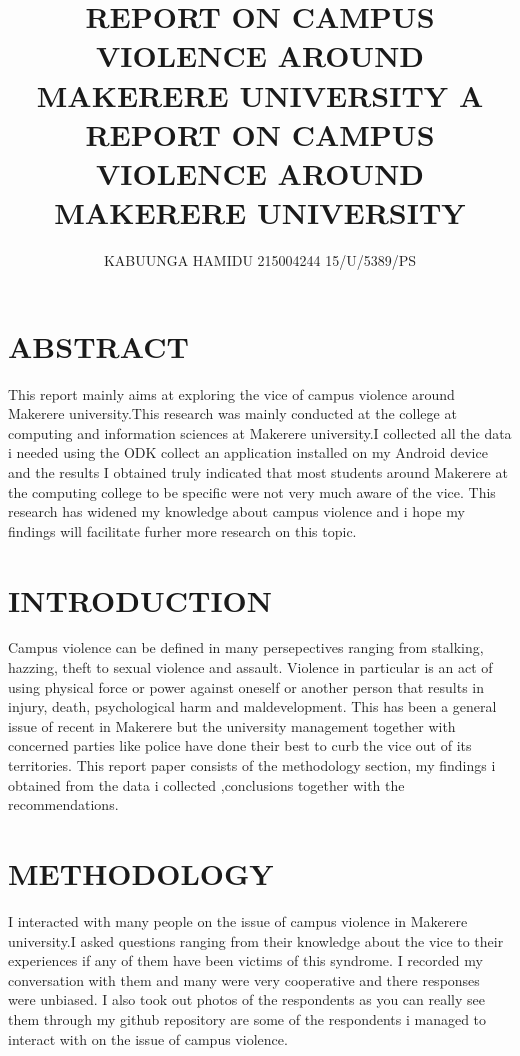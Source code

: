 \documentclass[10pt]{report}
\title{
{REPORT ON CAMPUS VIOLENCE AROUND MAKERERE UNIVERSITY}}
\author{
{KABUUNGA HAMIDU 215004244  15/U/5389/PS}}
\begin{document}
	\title{	{A REPORT ON  CAMPUS VIOLENCE AROUND MAKERERE UNIVERSITY}\\}
\maketitle
\section{ABSTRACT}
{This report mainly aims at exploring the vice of campus violence around Makerere university.This research was mainly conducted at the college at computing and information sciences at Makerere university.I collected all the data i needed using the ODK collect an application installed on my Android device and the results I obtained truly indicated that most students around Makerere at the computing college to be specific were not very much aware of the vice. This research has widened my knowledge about campus violence and i hope my findings will facilitate furher more research on this topic.}
\section{INTRODUCTION}
{Campus violence can be defined in many persepectives ranging from stalking, hazzing, theft to sexual violence and assault. Violence in particular is an act of using physical force or power against oneself or another person that results in injury, death, psychological harm and maldevelopment. This has been a general issue of recent in Makerere but the university management together with concerned parties like police have done their best to curb the vice out of its territories. This report paper consists of the methodology section, my findings i obtained from the data i collected ,conclusions together with the recommendations.}
\section{METHODOLOGY}
{I interacted with many people on the issue of campus violence in Makerere university.I asked questions ranging from their knowledge about the vice to their experiences if any of them have been victims of this syndrome. I recorded my conversation with them and many were very cooperative and there responses were unbiased. I also took out photos of  the respondents as you can really see them through my github repository are some of the respondents i managed to interact with on the issue of campus violence.}
\end{document}
